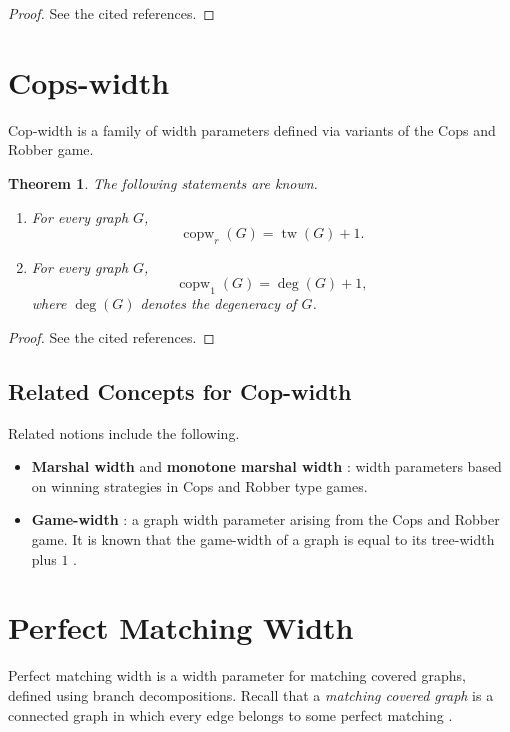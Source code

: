 \documentclass[10pt]{book}
\newtheorem{theorem}{Theorem}[section]
\theoremstyle{definition}
\begin{document}
\begin{proof}
See the cited references.
\end{proof}

\section{Cops-width}
Cop-width \cite{117,119,120} is a family of width parameters defined via variants of the Cops and Robber game.

\begin{theorem}
The following statements are known.
\begin{enumerate}
    \item For every graph \(G\),
    \[
    \operatorname{copw}_r(G)=\operatorname{tw}(G)+1.
    \]
    \cite{117,119,120}

    \item For every graph \(G\),
    \[
    \operatorname{copw}_1(G)=\operatorname{deg}(G)+1,
    \]
    where \(\operatorname{deg}(G)\) denotes the degeneracy of \(G\). \cite{345}
\end{enumerate}
\end{theorem}

\begin{proof}
See the cited references.
\end{proof}

\subsection{Related Concepts for Cop-width}
Related notions include the following.

\begin{itemize}
    \item \textbf{Marshal width} and \textbf{monotone marshal width} \cite{121}: width parameters based on winning strategies in Cops and Robber type games.
    \item \textbf{Game-width} \cite{216,327}: a graph width parameter arising from the Cops and Robber game. It is known that the game-width of a graph is equal to its tree-width plus \(1\) \cite{216}.
\end{itemize}

\section{Perfect Matching Width}
Perfect matching width \cite{142} is a width parameter for matching covered graphs, defined using branch decompositions.  
Recall that a \emph{matching covered graph} is a connected graph in which every edge belongs to some perfect matching \cite{szigeti2001generalizations,he2019perfect}.
\end{document}
